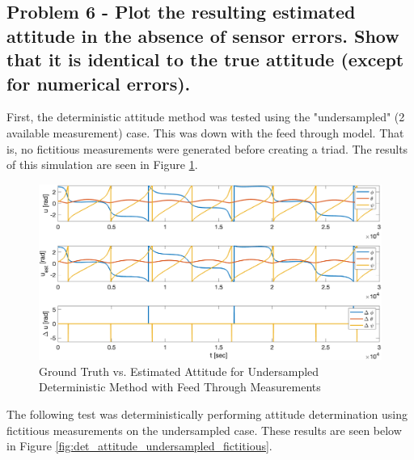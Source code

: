 \subsection{Problem 6 - Plot the resulting estimated attitude in the absence of sensor errors. Show that it is identical to the true attitude (except for numerical errors).}

First, the deterministic attitude method was tested using the "undersampled" (2 available measurement) case. This was down with the feed through model. That is, no fictitious measurements were generated before creating a triad. The results of this simulation are seen in Figure \ref{fig:det_attitude_undersampled_default}.

\begin{figure}[H]
    \centering
    \captionsetup{ justification = centering }
    \includegraphics[width = 12cm]{Images/PS6/attitude_estimation_undersampled_det_default.png}
    \caption{Ground Truth vs. Estimated Attitude for Undersampled Deterministic Method with Feed Through Measurements}
    \label{fig:det_attitude_undersampled_default}
\end{figure}

The following test was deterministically performing attitude determination using fictitious measurements on the undersampled case. These results are seen below in Figure \ref{fig:det_attitude_undersampled_fictitious}. 

